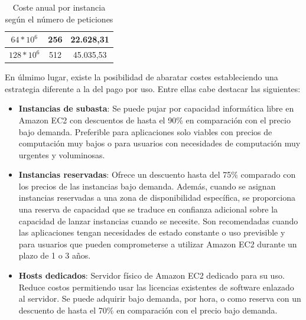 \begin{table}
\begin{tabular}{ccc}
\multicolumn{1}{|c|}{$64 * 10^6$}                                      & \multicolumn{1}{c|}{256}                                                                                                       & \multicolumn{1}{c|}{22.628,31}                                                                                \\ \hline
\multicolumn{1}{|c|}{$128 * 10^6$}                                     & \multicolumn{1}{c|}{512}                                                                                                       & \multicolumn{1}{c|}{45.035,53} \\ \hline
\end{tabular}
\caption{Coste anual por instancia según el número de peticiones \label{tab:costepeticiones}}
\end{table}

En úlmimo lugar, existe la posibilidad de abaratar costes estableciendo una estrategia diferente a la del pago por uso. Entre ellas cabe destacar las siguientes:
\begin{itemize}
\item \textbf{Instancias de subasta}: Se puede pujar por capacidad informática libre en Amazon EC2 con descuentos de hasta el 90\% en comparación con el precio bajo demanda. Preferible para  aplicaciones solo viables con precios de computación muy bajos o para usuarios con necesidades de computación muy urgentes y voluminosas.
\item \textbf{Instancias reservadas}: Ofrece un descuento hasta del 75\% comparado con los precios de las instancias bajo demanda. Además, cuando se asignan instancias reservadas a una zona de disponibilidad específica, se proporciona una reserva de capacidad que se traduce en confianza adicional sobre la capacidad de lanzar instancias cuando se necesite. Son recomendadas cuando las aplicaciones tengan necesidades de estado constante o uso previsible y para usuarios que pueden comprometerse a utilizar Amazon EC2 durante un plazo de 1 o 3 años.
\item \textbf{Hosts dedicados}: Servidor físico de Amazon EC2 dedicado para su uso. Reduce costos permitiendo usar las licencias existentes de software enlazado al servidor. Se puede adquirir bajo demanda, por hora, o como reserva con un descuento de hasta el 70\% en comparación con el precio bajo demanda.
\end{itemize}


